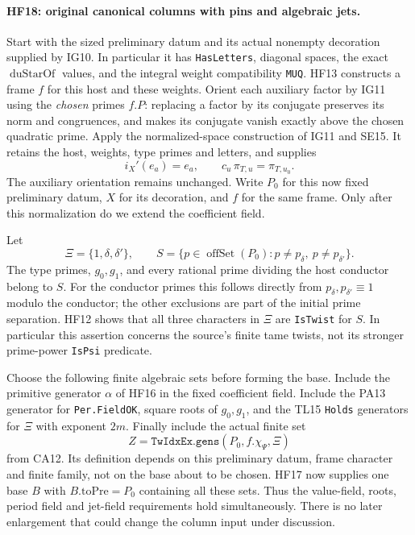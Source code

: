 \paragraph{HF18: original canonical columns with pins and algebraic jets.}
Start with the sized preliminary datum and its actual
nonempty decoration supplied by IG10. In particular it
has \texttt{HasLetters}, diagonal spaces, the exact
$\operatorname{duStarOf}$ values, and the integral
weight compatibility \texttt{MUQ}. HF13 constructs a
frame $f$ for this host and these weights.
Orient each auxiliary factor by IG11 using the
\emph{chosen} primes $f.P$: replacing a factor by
its conjugate preserves its norm and congruences,
and makes its conjugate vanish exactly above the
chosen quadratic prime. Apply the normalized-space
construction of IG11 and SE15. It retains the host,
weights, type primes and letters, and supplies
\[
 i_X'(e_a)=e_a,\qquad
       c_u\,\pi_{T,u}=\pi_{T,u_0}.                  \tag{HF.42}
\]
The auxiliary orientation remains unchanged.
Write $P_0$ for this now fixed preliminary datum,
$X$ for its decoration, and $f$ for the same frame.
Only after this normalization do we extend the
coefficient field.

Let
\[
 \Xi=\{1,\delta,\delta'\},\qquad
 S=\{p\in\operatorname{offSet}(P_0):
                     p\ne p_\delta,\ p\ne p_{\delta'}\}.
 \tag{HF.43}
\]
The type primes, $g_0,g_1$, and every rational prime
dividing the host conductor belong to $S$.
For the conductor primes this follows directly
from $p_\delta,p_{\delta'}\equiv1$ modulo the
conductor; the other exclusions are part of the
initial prime separation. HF12 shows that all three
characters in $\Xi$ are \texttt{IsTwist} for $S$.
In particular this assertion concerns the source's
finite tame twists, not its stronger prime-power
\texttt{IsPsi} predicate.

Choose the following finite algebraic sets before
forming the base. Include the primitive generator
$\alpha$ of HF16 in the fixed coefficient field.
Include the PA13 generator for \texttt{Per.FieldOK},
square roots of $g_0,g_1$, and the TL15
\texttt{Holds} generators for $\Xi$ with exponent
$2m$. Finally include the actual finite set
\[
 Z=\texttt{TwIdxEx.gens}(P_0,f.\chi_\Psi,\Xi)
                                                               \tag{HF.44}
\]
from CA12. Its definition depends on this preliminary
datum, frame character and finite family, not on the
base about to be chosen. HF17 now supplies one base
$B$ with $B.\mathrm{toPre}=P_0$ containing all these
sets. Thus the value-field, roots, period field and
jet-field requirements hold simultaneously. There
is no later enlargement that could change the
column input under discussion.

